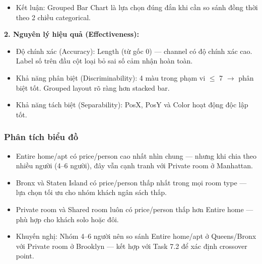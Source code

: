 \begin{itemize}
\begin{itemize}
        \item Ưu tiên 3 -- Màu sắc (Color Hue): Color Hue mã hóa Room Type (Categorical/Nominal), xác định cấu trúc grouped bên trong mỗi borough. Theo Mackinlay, Color Hue phù hợp cho dữ liệu danh mục, đặc biệt khi cần phân biệt các nhóm nhỏ trong cùng một vị trí ngang. Kênh này cho phép biểu đồ truyền tải đồng thời hai chiều so sánh: liên borough (theo PosX) và liên room type (theo Color Hue) trong một view duy nhất --- đây là lợi thế đặc trưng của grouped bar chart so với faceting riêng biệt.
    \end{itemize}
    \item Kết luận: Grouped Bar Chart là lựa chọn đúng đắn khi cần so sánh đồng thời theo 2 chiều categorical.
\end{itemize}

\textbf{2. Nguyên lý hiệu quả (Effectiveness):}

\begin{itemize}
    \item Độ chính xác (Accuracy): Length (từ gốc 0) --- channel có độ chính xác cao. Label số trên đầu cột loại bỏ sai số cảm nhận hoàn toàn.
    \item Khả năng phân biệt (Discriminability): 4 màu trong phạm vi $\leq$ 7 $\rightarrow$ phân biệt tốt. Grouped layout rõ ràng hơn stacked bar.
    \item Khả năng tách biệt (Separability): PosX, PosY và Color hoạt động độc lập tốt.
\end{itemize}

\subsubsection{Phân tích biểu đồ}

\begin{itemize}
    \item Entire home/apt có price/person cao nhất nhìn chung --- nhưng khi chia theo nhiều người (4--6 người), đây vẫn cạnh tranh với Private room ở Manhattan.
    \item Bronx và Staten Island có price/person thấp nhất trong mọi room type --- lựa chọn tối ưu cho nhóm khách ngân sách thấp.
    \item Private room và Shared room luôn có price/person thấp hơn Entire home --- phù hợp cho khách solo hoặc đôi.
    \item Khuyến nghị: Nhóm 4--6 người nên so sánh Entire home/apt ở Queens/Bronx với Private room ở Brooklyn --- kết hợp với Task 7.2 để xác định crossover point.
\end{itemize}
